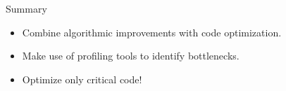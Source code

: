 \documentclass{beamer}
\begin{document}
\begin{frame}{Summary}
\begin{itemize}
\item Combine algorithmic improvements with code optimization.

\item Make use of profiling tools to identify bottlenecks.

\item Optimize only critical code!

\end{itemize}

\end{frame}
\end{document}
